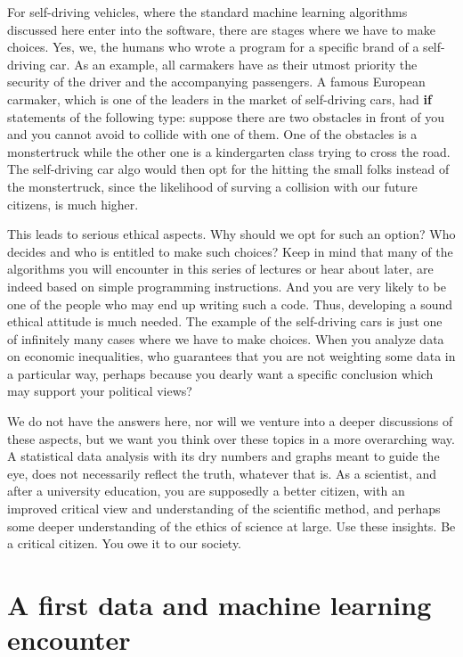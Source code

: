 \documentclass[%
oneside,                 %
final,                   %
10pt]{article}
\begin{document}
For self-driving vehicles, where the standard machine
learning algorithms discussed here enter into the software, there are
stages where we have to make choices. Yes, we, the humans who wrote
a program for a specific brand of a self-driving car.  As an example,
all carmakers have as their utmost priority the security of the
driver and the accompanying passengers. A famous European carmaker, which is
one of the leaders in the market of self-driving cars, had \textbf{if}
statements of the following type: suppose there are two obstacles in
front of you and you cannot avoid to collide with one of them. One of
the obstacles is a monstertruck while the other one is a kindergarten
class trying to cross the road. The self-driving car algo would then
opt for the hitting the small folks instead of the monstertruck, since
the likelihood of surving a collision with our future citizens, is
much higher.

This leads to serious ethical aspects. Why should we
opt for such an option? Who decides and who is entitled to make such
choices? Keep in mind that many of the algorithms you will encounter in
this series of lectures or hear about later, are indeed based on
simple programming instructions. And you are very likely to be one of
the people who may end up writing such a code. Thus, developing a
sound ethical attitude is much needed. The example of the self-driving cars is
just one of infinitely many cases where we have to make choices. When
you analyze data on economic inequalities, who guarantees that you are
not weighting some data in a particular way, perhaps because you dearly want a
specific conclusion which may support your political views?

We do not have the answers here, nor will we venture into a deeper
discussions of these aspects, but we want you think over these topics
in a more overarching way.  A statistical data analysis with its dry
numbers and graphs meant to guide the eye, does not necessarily
reflect the truth, whatever that is.  As a scientist, and after a
university education, you are supposedly a better citizen, with an
improved critical view and understanding of the scientific method, and
perhaps some deeper understanding of the ethics of science at
large. Use these insights. Be a critical citizen. You owe it to our
society.




\section{A first data and machine learning encounter}
\end{document}

